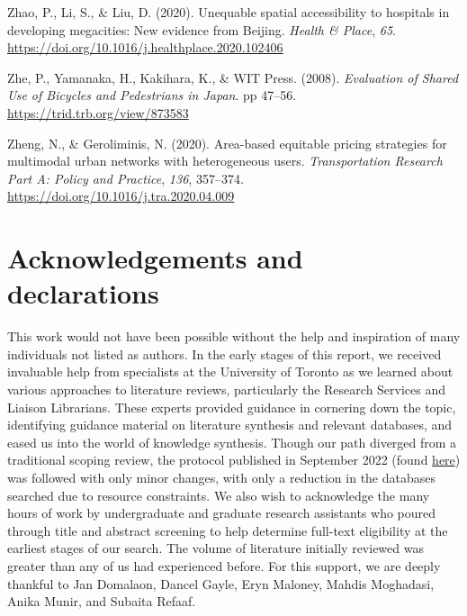 \documentclass[
  letterpaper,
  DIV=11,
  numbers=noendperiod]{scrartcl}
\newlength{\cslhangindent}
\newenvironment{CSLReferences}[2] %
 {\begin{list}{}{%
  \setlength{\itemindent}{0pt}
  \setlength{\leftmargin}{0pt}
  \setlength{\parsep}{0pt}
  \ifodd #1
   \setlength{\leftmargin}{\cslhangindent}
   \setlength{\itemindent}{-1\cslhangindent}
  \fi
  \setlength{\itemsep}{#2\baselineskip}}}
 {\end{list}}
\begin{document}
\begin{CSLReferences}{1}{0}
Zhao, P., Li, S., \& Liu, D. (2020). Unequable spatial accessibility to
hospitals in developing megacities: {New} evidence from {Beijing}.
\emph{Health \& Place}, \emph{65}.
\url{https://doi.org/10.1016/j.healthplace.2020.102406}

Zhe, P., Yamanaka, H., Kakihara, K., \& WIT Press. (2008).
\emph{Evaluation of {Shared Use} of {Bicycles} and {Pedestrians} in
{Japan}}. pp 47--56. \url{https://trid.trb.org/view/873583}

Zheng, N., \& Geroliminis, N. (2020). Area-based equitable pricing
strategies for multimodal urban networks with heterogeneous users.
\emph{Transportation Research Part A: Policy and Practice}, \emph{136},
357--374. \url{https://doi.org/10.1016/j.tra.2020.04.009}

\end{CSLReferences}

\section{Acknowledgements and
declarations}\label{acknowledgements-and-declarations}

This work would not have been possible without the help and inspiration
of many individuals not listed as authors. In the early stages of this
report, we received invaluable help from specialists at the University
of Toronto as we learned about various approaches to literature reviews,
particularly the Research Services and Liaison Librarians. These experts
provided guidance in cornering down the topic, identifying guidance
material on literature synthesis and relevant databases, and eased us
into the world of knowledge synthesis. Though our path diverged from a
traditional scoping review, the protocol published in September 2022
(found \href{https://osf.io/rsb92}{here}) was followed with only minor
changes, with only a reduction in the databases searched due to resource
constraints. We also wish to acknowledge the many hours of work by
undergraduate and graduate research assistants who poured through title
and abstract screening to help determine full-text eligibility at the
earliest stages of our search. The volume of literature initially
reviewed was greater than any of us had experienced before. For this
support, we are deeply thankful to Jan Domalaon, Dancel Gayle, Eryn
Maloney, Mahdis Moghadasi, Anika Munir, and Subaita Refaaf.
\end{document}
